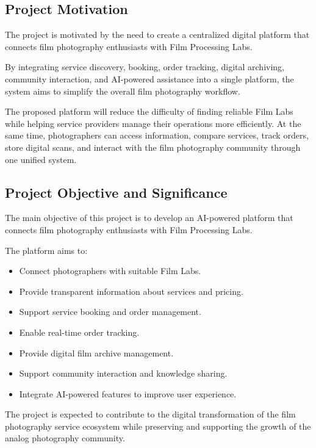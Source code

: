 \subsection{Project Motivation}

The project is motivated by the need to create a centralized digital platform that connects film photography enthusiasts with Film Processing Labs.

By integrating service discovery, booking, order tracking, digital archiving, community interaction, and AI-powered assistance into a single platform, the system aims to simplify the overall film photography workflow.

The proposed platform will reduce the difficulty of finding reliable Film Labs while helping service providers manage their operations more efficiently. At the same time, photographers can access information, compare services, track orders, store digital scans, and interact with the film photography community through one unified system.

\subsection{Project Objective and Significance}

The main objective of this project is to develop an AI-powered platform that connects film photography enthusiasts with Film Processing Labs.

The platform aims to:

\begin{itemize}
    \item Connect photographers with suitable Film Labs.
    \item Provide transparent information about services and pricing.
    \item Support service booking and order management.
    \item Enable real-time order tracking.
    \item Provide digital film archive management.
    \item Support community interaction and knowledge sharing.
    \item Integrate AI-powered features to improve user experience.
\end{itemize}

The project is expected to contribute to the digital transformation of the film photography service ecosystem while preserving and supporting the growth of the analog photography community.